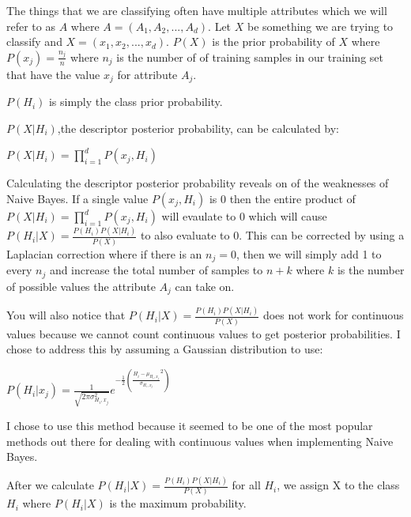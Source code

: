 \documentclass[paper=letter, fontsize=11pt]{article}
\numberwithin{equation}{section}		%
\numberwithin{figure}{section}			%
\numberwithin{table}{section}				%
\begin{document}
\noindent The things that we are classifying often have multiple attributes which we will refer to as $A$ where $A = (A_1,A_2,...,A_d)$. Let $X$ be something we are trying to classify and $X = (x_1, x_2, ..., x_d)$. $P(X)$ is the prior probability of $X$ where $P(x_j) = \frac{n_j}{n}$ where $n_j$ is the number of of training samples in our training set that have the value $x_j$ for attribute $A_j$. 

$P(H_i)$ is simply the class prior probability. 

$P(X|H_i)$,the descriptor posterior probability, can be calculated by:

\begin{center} $P(X|H_i) = \prod_{i=1}^{d} P(x_j, H_i)$ \end{center}

\noindent Calculating the descriptor posterior probability reveals on of the weaknesses of Naive Bayes. If a single value $P(x_j, H_i)$ is 0 then the entire product of $P(X|H_i) = \prod_{i=1}^{d} P(x_j, H_i)$ will evaulate to 0 which will cause $P(H_i|X) = \frac{P(H_i)P(X|H_i)}{P(X)}$ to also evaluate to 0. This can be corrected by using a Laplacian correction where if there is an $n_j = 0$, then we will simply add 1 to every $n_j$ and increase the total number of samples to $n+k$ where $k$ is the number of possible values the attribute $A_j$ can take on. 

\noindent You will also notice that $P(H_i|X) = \frac{P(H_i)P(X|H_i)}{P(X)}$ does not work for continuous values because we cannot count continuous values to get posterior probabilities. I chose to address this by assuming a Gaussian distribution to use:

\begin{center} $P(H_i | x_j) = \frac{1}{\sqrt{2\pi\sigma_{H_i,x_j}^2}}e^{-\frac{1}{2}(\frac{H_i-\mu_{H_i,x_j}}{\sigma_{H_i,x_j}}^2)}$ \end{center}

\noindent I chose to use this method because it seemed to be one of the most popular methods out there for dealing with continuous values when implementing Naive Bayes. 

\noindent After we calculate $P(H_i|X) = \frac{P(H_i)P(X|H_i)}{P(X)}$ for all $H_i$, we assign X to the class $H_i$ where $P(H_i|X)$ is the maximum probability.
\end{document}
